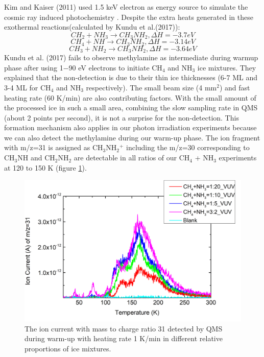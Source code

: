 Kim and Kaiser (2011) used 1.5 keV electron as energy source to simulate the cosmic ray induced photochemistry \cite{kim}. Despite the extra heats generated in these exothermal reactions(calculated by Kundu et al.(2017)\cite{kundu2017electron}):
\begin{equation}
CH_2 + NH_3 \rightarrow CH_3NH_2, \Delta H = -3.7 eV
\label{eq:methylamine_1}
\end{equation}
\begin{equation}
CH_4 + NH \rightarrow CH_3NH_2, \Delta H = -3.14 eV
\label{eq:methylamine_2}
\end{equation}
\begin{equation}
CH_3 + NH_2 \rightarrow CH_3NH_2, \Delta H = -3.64 eV
\label{eq:methylamine_3}
\end{equation}
Kundu et al. (2017) \cite{kundu2017electron} fails to observe methylamine as intermediate during warmup phase after using 1$-$90 eV electrons to initiate CH$_4$ and NH$_3$ ice mixtures. They explained that the non-detection is due to their thin ice thicknesses (6-7 ML and 3-4 ML for CH$_4$ and NH$_3$ respectively). The small beam size (4 mm$^2$) and fast heating rate (60 K/min) are also contributing factors. With the small amount of the processed ice in such a small area, combining the slow sampling rate in QMS (about 2 points per second), it is not a surprise for the non-detection. This formation mechanism also applies in our photon irradiation experiments because we can also detect the methylamine during our warm-up phase. The ion fragment with m/z=31 is assigned as CH$_3$NH$_2$$^+$ including the m/z=30 corresponding to CH$_3$NH and CH$_2$NH$_2$ are detectable in all ratios of our CH$_4$ + NH$_3$ experiments at 120 to 150 K (figure \ref{Mass31}).\\

\begin{figure}
\centering
\includegraphics[width=\textwidth]{figures/chapter3/mass31.png}
\caption{The ion current with mass to charge ratio 31 detected by QMS during warm-up with heating rate 1 K/min in different relative proportions of ice mixtures.}
\label{Mass31}
\end{figure}

